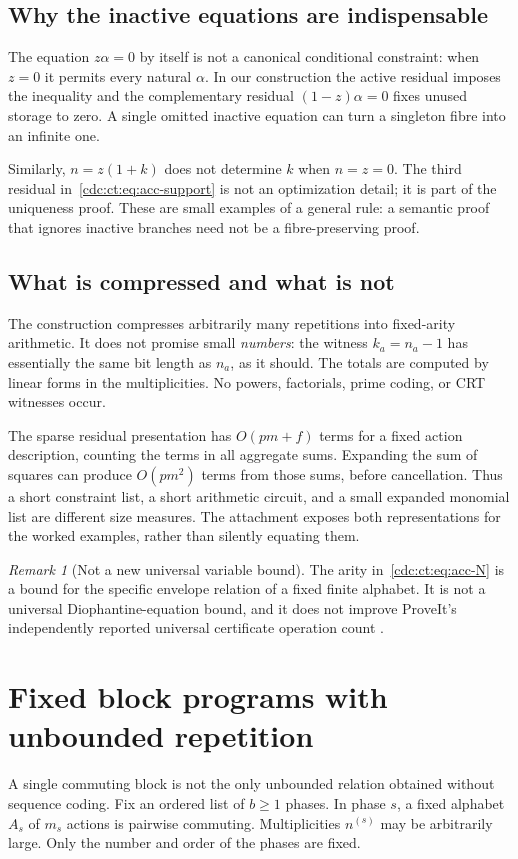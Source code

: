 \documentclass[11pt,a4paper]{article}
\theoremstyle{definition}
\theoremstyle{remark}
\newtheorem{remark}[remark]{Remark}
\newcommand{\srctag}[1]{\texorpdfstring{\hspace{0.5em}{\normalfont\small\color{accent}[#1]}}{ [#1]}}
\begin{document}
\subsection{Why the inactive equations are indispensable}
The equation $z\alpha=0$ by itself is not a canonical conditional constraint: when $z=0$ it permits every natural $\alpha$. In our construction the active residual imposes the inequality and the complementary residual $(1-z)\alpha=0$ fixes unused storage to zero. A single omitted inactive equation can turn a singleton fibre into an infinite one.

Similarly, $n=z(1+k)$ does not determine $k$ when $n=z=0$. The third residual in~\eqref{cdc:ct:eq:acc-support} is not an optimization detail; it is part of the uniqueness proof. These are small examples of a general rule: a semantic proof that ignores inactive branches need not be a fibre-preserving proof.

\subsection{What is compressed and what is not}
The construction compresses arbitrarily many repetitions into fixed-arity arithmetic. It does not promise small \emph{numbers}: the witness $k_a=n_a-1$ has essentially the same bit length as $n_a$, as it should. The totals are computed by linear forms in the multiplicities. No powers, factorials, prime coding, or CRT witnesses occur.

The sparse residual presentation has $O(pm+f)$ terms for a fixed action description, counting the terms in all aggregate sums. Expanding the sum of squares can produce $O(pm^2)$ terms from those sums, before cancellation. Thus a short constraint list, a short arithmetic circuit, and a small expanded monomial list are different size measures. The attachment exposes both representations for the worked examples, rather than silently equating them.

\begin{remark}[Not a new universal variable bound]
The arity in~\eqref{cdc:ct:eq:acc-N} is a bound for the specific envelope relation of a fixed finite alphabet. It is not a universal Diophantine-equation bound, and it does not improve ProveIt's independently reported universal certificate operation count \cite{repo-h10}.
\end{remark}

\section{Fixed block programs with unbounded repetition\srctag{01}}\label{cdc:ct:sec:blocks}
A single commuting block is not the only unbounded relation obtained without sequence coding. Fix an ordered list of $b\ge1$ phases. In phase $s$, a fixed alphabet $A_s$ of $m_s$ actions is pairwise commuting. Multiplicities $n^{(s)}$ may be arbitrarily large. Only the number and order of the phases are fixed.
\end{document}

